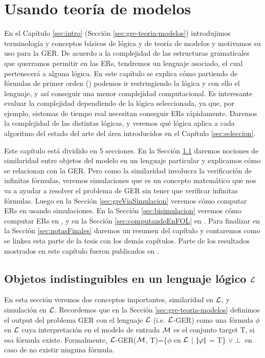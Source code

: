 \chapter{Usando teor\'ia de modelos}
\label{sec:intro_logica}

En el Cap\'itulo \ref{sec:intro} (Secci\'on \ref{sec:gre-teoria-modelos}) introdujimos terminolog\'ia y conceptos b\'asicos de l\'ogica y de teor\'ia de modelos y motivamos su uso para la GER.
De acuerdo a la complejidad de las estructuras gramaticales que querramos permitir en las ERs, tendremos un lenguaje asociado, 
el cual pertenecer\'a a alguna l\'ogica. En este cap\'itulo se explica c\'omo partiendo de f\'ormulas de primer orden (\FOL) 
podemos ir restringiendo la l\'ogica y con ello el lenguaje, y as\'i conseguir una menor complejidad computacional. Es interesante evaluar la complejidad dependiendo de la l\'ogica seleccionada, 
ya que, por ejemplo, sistemas de tiempo real necesitan conseguir ERs r\'apidamente. Daremos la complejidad de las distintas l\'ogicas, 
y veremos qu\'e l\'ogica aplica a cada algoritmo del estado del arte del \'area introducidos en el Cap\'itulo \ref{sec:seleccion}.

Este cap\'itulo est\'a dividido en 5 secciones. En la Secci\'on \ref{sec:seleccionandoLenguaje} daremos nociones de similaridad entre objetos del modelo en un lenguaje particular y explicamos c\'omo se relacionan con la GER. Pero como la similaridad involucra la verificaci\'on de infinitas f\'ormulas, veremos simulaciones que es un concepto matem\'atico que nos va a ayudar a resolver el problema de GER sin tener que verificar infinitas f\'ormulas. Luego en la Secci\'on \ref{sec:greViaSimulacion} veremos c\'omo computar ERs en \EL usando simulaciones. En la Secci\'on \ref{sec:bisimulacion} veremos c\'omo computar ERs en \ALC, y en la Secci\'on \ref{sec:computandoEnFOL} en \EPFOL. Para finalizar en la Secci\'on \ref{sec:notasFinales} daremos un resumen del cap\'itulo y contaremos como se linkea esta parte de la tesis con los dem\'as cap\'itulos. Parte de los resultados mostrados en este cap\'itulo fueron publicados en \cite{areces08,arec:usin11}.


\section{Objetos indistinguibles en un lenguaje l\'ogico $\mathcal{L}$}
\label{sec:seleccionandoLenguaje}

En esta secci\'on veremos dos conceptos importantes, similaridad en $\mathcal{L}$, y simulaci\'on en $\mathcal{L}$. Recordemos que en la Secci\'on \ref{sec:gre-teoria-modelos} definimos el output del problema GER con el lenguaje $\mathcal{L}$ (i.e. $\mathcal{L}$-GER) como una f\'ormula $\phi$ en $\mathcal{L}$ cuya interpretaci\'on en el modelo de entrada  $\mathcal{M}$ es el conjunto target T, si esa f\'ormula existe. Formalmente, $\mathcal{L}$-GER($\mathcal{M}$, T)=\{$\phi$ en $\mathcal{L}$ | $|\!|\varphi|\!|$ = T\} $\lor \perp$ en caso de no existir ninguna f\'ormula.

